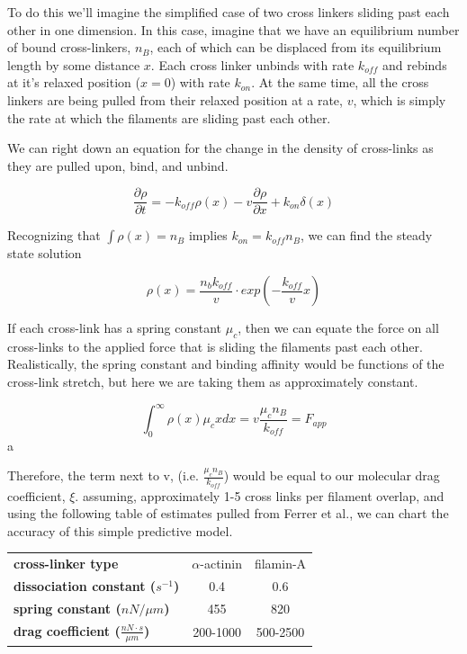 \documentclass[pre,reprint]{revtex4-1}
\begin{document}
To do this we'll imagine the simplified case of two cross linkers sliding past each other in one dimension.  In this case, imagine that we have an equilibrium number of bound cross-linkers, $n_B$, each of which can be displaced from its equilibrium length by some distance $x$.  Each cross linker unbinds with rate $k_{off}$ and rebinds at it's relaxed position ($x=0$) with rate $k_{on}$.  At the same time, all the cross linkers are being pulled from their relaxed position at a rate, $v$, which is simply the rate at which the filaments are sliding past each other.  

We can right down an equation for the change in the density of cross-links as they are pulled upon, bind, and unbind.

\begin{equation}
\frac{\partial \rho}{\partial t} = -k_{off}\rho(x) - v\frac{\partial \rho}{\partial x} + k_{on}\delta(x)
\end{equation}

Recognizing that $\int \rho(x)=n_B$ implies $k_{on}=k_{off}n_B$, we can find the steady state solution

\begin{equation}
\rho(x) = \frac{n_b k_{off}}{v}\cdot exp\left ( -\frac{k_{off}}{v}x \right )
\end{equation}

If each cross-link has a spring constant $\mu_c$, then we can equate the force on all cross-links to the applied force that is sliding the filaments past each other.  Realistically, the spring constant and binding affinity would be functions of the cross-link stretch, but here we are taking them as approximately constant.  

\begin{equation}
\int_{0}^{\infty}\rho(x)\mu_cx dx = v \frac{\mu_c n_B}{k_{off}}= F_{app}
\end{equation}a

Therefore, the term next to v, (i.e. $\tfrac{\mu_c n_B}{k_{off}}$) would be equal to our molecular drag coefficient, $\xi$.  assuming, approximately 1-5 cross links per filament overlap, and using the following table of estimates pulled from Ferrer et al., we can chart the accuracy of this simple predictive model.

\begin{table}[h]
\begin{tabular}{| l | c | c |}
\hline
\textbf{cross-linker type} & $\alpha$-actinin & filamin-A  \\ \cline{1-1}
\textbf{dissociation constant ($s^{-1}$)} & 0.4 & 0.6 \\ \cline{1-1}
\textbf{spring constant ($nN / \mu m$)} & 455 & 820 \\ \cline{1-1}
\textbf{drag coefficient ($\tfrac{nN \cdot s}{\mu m}$)} & 200-1000 & 500-2500 \\ 
\hline
\end{tabular}
\end{table}
\end{document}
